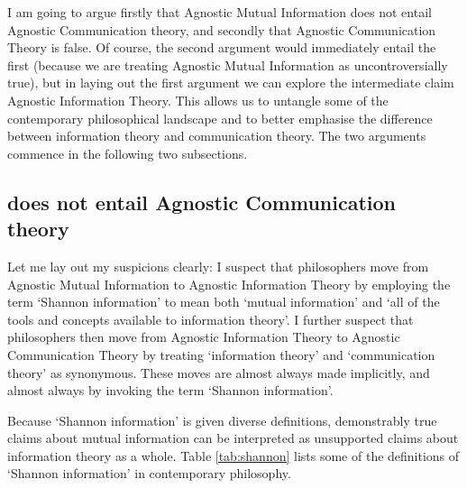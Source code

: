 I am going to argue firstly that {\sc Agnostic Mutual Information} does not entail {\sc Agnostic Communication theory}, and secondly that {\sc Agnostic Communication Theory} is false.
Of course, the second argument would immediately entail the first (because we are treating {\sc Agnostic Mutual Information} as uncontroversially true), but in laying out the first argument we can explore the intermediate claim {\sc Agnostic Information Theory}.
This allows us to untangle some of the contemporary philosophical landscape and to better emphasise the difference between information theory and communication theory.
The two arguments commence in the following two subsections.

\subsection{ does not entail {\sc Agnostic Communication theory}}

Let me lay out my suspicions clearly: I suspect that philosophers move from {\sc Agnostic Mutual Information} to {\sc Agnostic Information Theory} by employing the term `Shannon information' to mean both `mutual information' and `all of the tools and concepts available to information theory'.
I further suspect that philosophers then move from {\sc Agnostic Information Theory} to {\sc Agnostic Communication Theory} by treating `information theory' and `communication theory' as synonymous.
These moves are almost always made implicitly, and almost always by invoking the term `Shannon information'.

Because `Shannon information' is given diverse definitions, demonstrably true claims about mutual information can be interpreted as unsupported claims about information theory as a whole.
Table \ref{tab:shannon} lists some of the definitions of `Shannon information' in contemporary philosophy.




